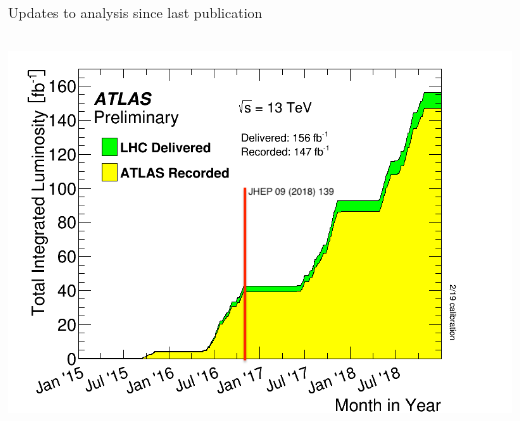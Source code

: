 \documentclass[aspectratio=169,xcolor=table]{beamer}
\begin{document}
\begin{frame}[t]{Updates to analysis since last publication}
\begin{columns}
      \includegraphics[width=1.1\textwidth,keepaspectratio=true]{intlumivstimeRun2.png}
      \end{columns}
    \end{frame}
\end{document}
